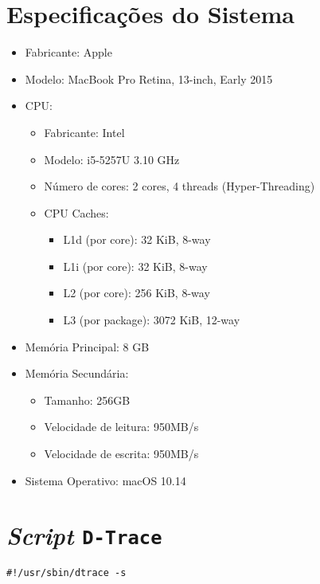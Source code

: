 \documentclass{article}
\begin{document}
\printbibliography

\newpage 
\begin{appendices}

\section{Especificações do Sistema}
\label{sys_hw_sw}
\begin{itemize}
    \item Fabricante: Apple
    \item Modelo: MacBook Pro Retina, 13-inch, Early 2015
    \item CPU:
        \begin{itemize}
            \item Fabricante: Intel
            \item Modelo: i5-5257U 3.10 GHz
            \item Número de cores: 2 cores, 4 threads (Hyper-Threading)
            \item CPU Caches:
                \begin{itemize}
                    \item L1d (por core): 32 KiB, 8-way
                    \item L1i (por core): 32 KiB, 8-way
                    \item L2 (por core): 256 KiB, 8-way
                    \item L3 (por package): 3072 KiB, 12-way
                \end{itemize}
        \end{itemize}
    \item Memória Principal: 8 GB
    \item Memória Secundária:
        \begin{itemize}
            \item Tamanho: 256GB
            \item Velocidade de leitura: 950MB/s
            \item Velocidade de escrita: 950MB/s
        \end{itemize}
    \item Sistema Operativo: macOS 10.14
\end{itemize}

\section{\textit{Script} \texttt{D-Trace}}
\label{script_dtrace}
\begin{verbatim}
#!/usr/sbin/dtrace -s


\end{verbatim}
\end{appendices}
\end{document}
